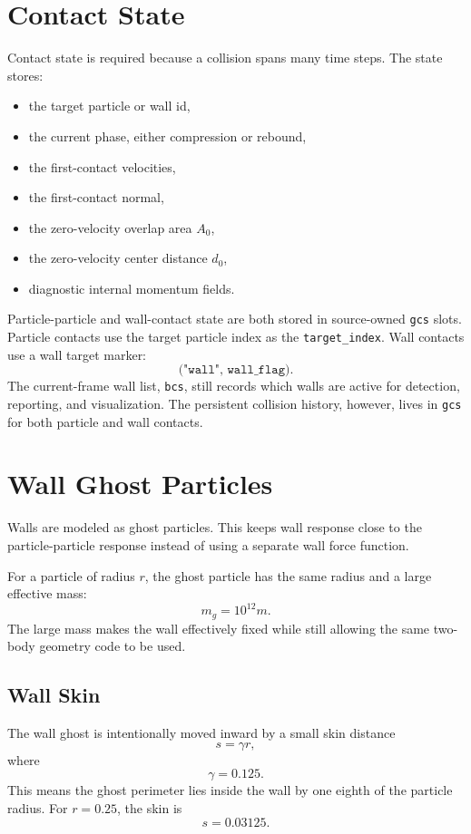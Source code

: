 \documentclass[11pt]{article}
\begin{document}
\section{Contact State}

Contact state is required because a collision spans many time steps. The state
stores:

\begin{itemize}[noitemsep]
    \item the target particle or wall id,
    \item the current phase, either compression or rebound,
    \item the first-contact velocities,
    \item the first-contact normal,
    \item the zero-velocity overlap area \(A_0\),
    \item the zero-velocity center distance \(d_0\),
    \item diagnostic internal momentum fields.
\end{itemize}

Particle-particle and wall-contact state are both stored in source-owned
\texttt{gcs} slots. Particle contacts use the target particle index as the
\texttt{target\_index}. Wall contacts use a wall target marker:
\[
    \texttt{("wall", wall\_flag)}.
\]
The current-frame wall list, \texttt{bcs}, still records which walls are active
for detection, reporting, and visualization. The persistent collision history,
however, lives in \texttt{gcs} for both particle and wall contacts.

\section{Wall Ghost Particles}

Walls are modeled as ghost particles. This keeps wall response close to the
particle-particle response instead of using a separate wall force function.

For a particle of radius \(r\), the ghost particle has the same radius and a
large effective mass:
\[
    m_g = 10^{12}m.
\]
The large mass makes the wall effectively fixed while still allowing the same
two-body geometry code to be used.

\subsection{Wall Skin}

The wall ghost is intentionally moved inward by a small skin distance
\[
    s = \gamma r,
\]
where
\[
    \gamma = 0.125.
\]
This means the ghost perimeter lies inside the wall by one eighth of the
particle radius. For \(r = 0.25\), the skin is
\[
    s = 0.03125.
\]
\end{document}

